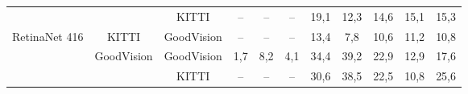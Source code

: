 \documentclass[twoside]{ctuthesis}
\theoremstyle{plain}
\theoremstyle{definition}
\theoremstyle{note}
\begin{document}
\begin{table}[hbt]
{\begin{tabular}{|c|c|c|c|c|c|c|c|c|c|c|}
                                                         &                                                                     & KITTI                                                              & --                                                                     & --                                                                 & --                                                                        & 19,1                                                               & 12,3                                                                  & 14,6                                                                 & 15,1                                                               & 15,3                                                            \\ \cline{3-11} 
\multirow{-3}{*}{RetinaNet 416}                          & \multirow{-2}{*}{KITTI}                                             & GoodVision                                                         & --                                                                     & --                                                                 & --                                                                        & 13,4                                                               & 7,8                                                                   & 10,6                                                                 & 11,2                                                               & 10,8                                                            \\ \hline
                                                         & GoodVision                                                          & GoodVision                                                         & 1,7                                                                    & 8,2                                                                & 4,1                                                                       & 34,4                                                               & 39,2                                                                  & 22,9                                                                 & 12,9                                                               & 17,6                                                            \\ \cline{2-11} 
                                                         &                                                                     & KITTI                                                              & --                                                                     & --                                                                 & --                                                                        & 30,6                                                               & 38,5                                                                  & 22,5                                                                 & 10,8                                                               & 25,6                                                            \\ \cline{3-11} 

\end{tabular}}
\end{table}
\end{document}
